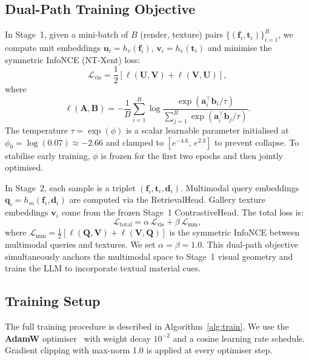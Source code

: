 \documentclass[10pt,twocolumn]{article}
\begin{document}
\subsection{Dual-Path Training Objective}
\label{sec:dualloss}

In Stage~1, given a mini-batch of $B$ (render, texture) pairs
$\{(\mathbf{f}_i, \mathbf{t}_i)\}_{i=1}^{B}$, we compute unit embeddings
$\mathbf{u}_i = h_v(\mathbf{f}_i)$, $\mathbf{v}_i = h_v(\mathbf{t}_i)$
and minimise the symmetric InfoNCE (NT-Xent) loss:
\begin{equation}
  \mathcal{L}_{\text{vis}} = \frac{1}{2}\left[
    \ell(\mathbf{U},\mathbf{V}) + \ell(\mathbf{V},\mathbf{U})
  \right],
  \label{eq:loss}
\end{equation}
where
\begin{equation}
  \ell(\mathbf{A},\mathbf{B}) =
  -\frac{1}{B}\sum_{i=1}^{B} \log
  \frac{\exp(\mathbf{a}_i^\top\mathbf{b}_i / \tau)}
       {\sum_{j=1}^{B}\exp(\mathbf{a}_i^\top\mathbf{b}_j / \tau)}.
\end{equation}
The temperature $\tau = \exp(\phi)$ is a scalar learnable parameter
initialised at $\phi_0 = \log(0.07) \approx -2.66$ and clamped to
$[e^{-4.6},\, e^{2.3}]$ to prevent collapse.
To stabilise early training, $\phi$ is frozen for the first two epochs and
then jointly optimised.

In Stage~2, each sample is a triplet $(\mathbf{f}_i, \mathbf{t}_i, \mathbf{d}_i)$.
Multimodal query embeddings $\mathbf{q}_i = h_m(\mathbf{f}_i, \mathbf{d}_i)$
are computed via the RetrievalHead.
Gallery texture embeddings $\mathbf{v}_i$ come from the frozen Stage~1
ContrastiveHead.
The total loss is:
\begin{equation}
  \mathcal{L}_{\text{total}} = \alpha\,\mathcal{L}_{\text{vis}} + \beta\,\mathcal{L}_{\text{mm}},
  \label{eq:dualloss}
\end{equation}
where $\mathcal{L}_{\text{mm}} = \tfrac{1}{2}[\ell(\mathbf{Q},\mathbf{V})+\ell(\mathbf{V},\mathbf{Q})]$
is the symmetric InfoNCE between multimodal queries and textures.
We set $\alpha = \beta = 1.0$.
This dual-path objective simultaneously anchors the multimodal space to
Stage~1 visual geometry and trains the LLM to incorporate textual material
cues.

\subsection{Training Setup}

The full training procedure is described in Algorithm~\ref{alg:train}.
We use the \textbf{AdamW} optimiser~\cite{loshchilov2019adamw} with weight
decay $10^{-2}$ and a cosine learning rate schedule.
Gradient clipping with max-norm 1.0 is applied at every optimiser step.
\end{document}
